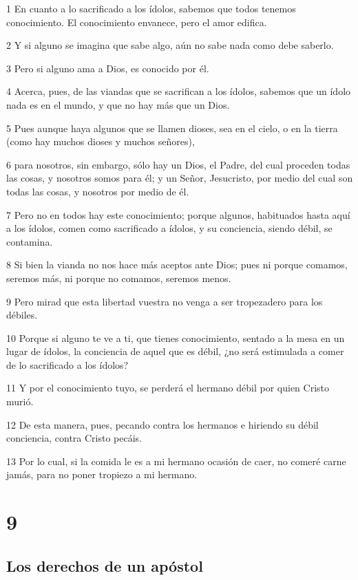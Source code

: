 \par 1 En cuanto a lo sacrificado a los ídolos, sabemos que todos tenemos conocimiento. El conocimiento envanece, pero el amor edifica.
\par 2 Y si alguno se imagina que sabe algo, aún no sabe nada como debe saberlo.
\par 3 Pero si alguno ama a Dios, es conocido por él.
\par 4 Acerca, pues, de las viandas que se sacrifican a los ídolos, sabemos que un ídolo nada es en el mundo, y que no hay más que un Dios.
\par 5 Pues aunque haya algunos que se llamen dioses, sea en el cielo, o en la tierra (como hay muchos dioses y muchos señores),
\par 6 para nosotros, sin embargo, sólo hay un Dios, el Padre, del cual proceden todas las cosas, y nosotros somos para él; y un Señor, Jesucristo, por medio del cual son todas las cosas, y nosotros por medio de él.
\par 7 Pero no en todos hay este conocimiento; porque algunos, habituados hasta aquí a los ídolos, comen como sacrificado a ídolos, y su conciencia, siendo débil, se contamina.
\par 8 Si bien la vianda no nos hace más aceptos ante Dios; pues ni porque comamos, seremos más, ni porque no comamos, seremos menos.
\par 9 Pero mirad que esta libertad vuestra no venga a ser tropezadero para los débiles.
\par 10 Porque si alguno te ve a ti, que tienes conocimiento, sentado a la mesa en un lugar de ídolos, la conciencia de aquel que es débil, ¿no será estimulada a comer de lo sacrificado a los ídolos?
\par 11 Y por el conocimiento tuyo, se perderá el hermano débil por quien Cristo murió.
\par 12 De esta manera, pues, pecando contra los hermanos e hiriendo su débil conciencia, contra Cristo pecáis.
\par 13 Por lo cual, si la comida le es a mi hermano ocasión de caer, no comeré carne jamás, para no poner tropiezo a mi hermano.

\chapter{9}

\section*{Los derechos de un apóstol}

